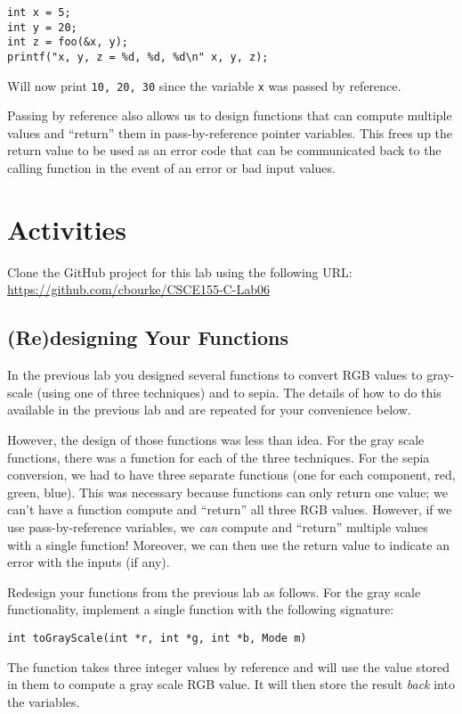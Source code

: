 \documentclass[12pt]{scrartcl}
\begin{document}
\begin{verbatim}
int x = 5;
int y = 20;
int z = foo(&x, y);
printf("x, y, z = %d, %d, %d\n" x, y, z);
\end{verbatim}

Will now print \texttt{10, 20, 30} since the variable \texttt{x}
was passed by reference.

Passing by reference also allows us to design functions that can
compute multiple values and ``return'' them in pass-by-reference
pointer variables.  This frees up the return value to be used as 
an error code that can be communicated back to the calling function
in the event of an error or bad input values.

\section{Activities}

Clone the GitHub project for this lab using the following URL:
\url{https://github.com/cbourke/CSCE155-C-Lab06}

\subsection{(Re)designing Your Functions}

In the previous lab you designed several functions to convert RGB
values to gray-scale (using one of three techniques) and to sepia.
The details of how to do this available in the previous lab and 
are repeated for your convenience below.  

However, the design of those functions was less than idea.  For the
gray scale functions, there was a function for each of the three 
techniques.  For the sepia conversion, we had to have three separate
functions (one for each component, red, green, blue).  This was 
necessary because functions can only return one value; we can't have
a function compute and ``return'' all three RGB values.  However,
if we use pass-by-reference variables, we \emph{can} compute and
``return'' multiple values with a single function!  Moreover, we
can then use the return value to indicate an error with the inputs
(if any).  

Redesign your functions from the previous lab as follows.  For 
the gray scale functionality, implement a single function with
the following signature:

\texttt{int toGrayScale(int *r, int *g, int *b, Mode m)}

The function takes three integer values by reference and will 
use the value stored in them to compute a gray scale RGB value.
It will then store the result \emph{back} into the variables.
\end{document}
